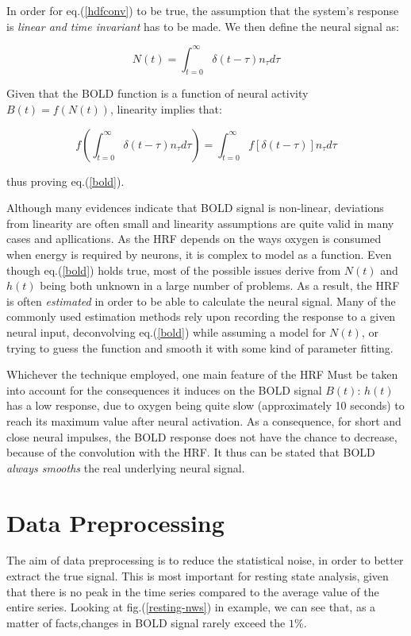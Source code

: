 \documentclass[12pt,openright,twoside,a4paper]{book}
\begin{document}
In order for eq.(\ref{hdfconv}) to be true, the assumption that the system's response is \textit{linear and time invariant} has to be made. We then define the neural signal as:

\begin{equation}
N(t)=\int_{t=0}^\infty \delta(t-\tau)n_{\tau}d\tau
\end{equation}

Given that the BOLD function is a function of neural activity $B(t) = f(N(t))$, linearity
implies that: 

\begin{equation}
f(\int_{t=0}^\infty \delta(t-\tau)n_{\tau}d\tau)=\int_{t=0}^\infty f[\delta(t-\tau)]n_{\tau}d\tau
\end{equation}

thus proving eq.(\ref{bold}).
\vspace{5mm}

Although many evidences indicate that BOLD signal is non-linear, deviations from linearity are often small and linearity assumptions are quite valid in many cases and apllications.
As the HRF depends on the ways oxygen is consumed when energy is required by neurons, it is complex to model as a function.
Even though eq.(\ref{bold}) holds true, most of the possible issues derive from $N(t)$ and $h(t)$ being both unknown in a large number of problems.
As a result, the HRF is often \textit{estimated} in order to be able to calculate the neural signal.
Many of the commonly used estimation methods rely upon recording the response to a given neural input, deconvolving eq.(\ref{bold}) while assuming a model for $N(t)$, or trying to guess the function and smooth it with some kind of parameter fitting.

Whichever the technique employed, one main feature of the HRF Must be taken into account for the consequences it induces on the BOLD signal $B(t)$: $h(t)$ has a low response, due to oxygen being quite slow (approximately 10 seconds) to reach its maximum value after neural activation.
As a consequence, for short and close neural impulses, the BOLD response does not have the chance to decrease, because of the convolution with the HRF. 
It thus can be stated that BOLD \textit{always smooths} the real underlying neural signal.

\section{Data Preprocessing}

The aim of data preprocessing is to reduce the statistical noise, in order to better extract the true signal.
This is most important for resting state analysis, given that there is no peak in the time series compared to the average value of the entire series. 
Looking at fig.(\ref{resting-nws}) in example, we can see that, as a matter of facts,changes in BOLD signal rarely exceed the $1\%$.
\end{document}
